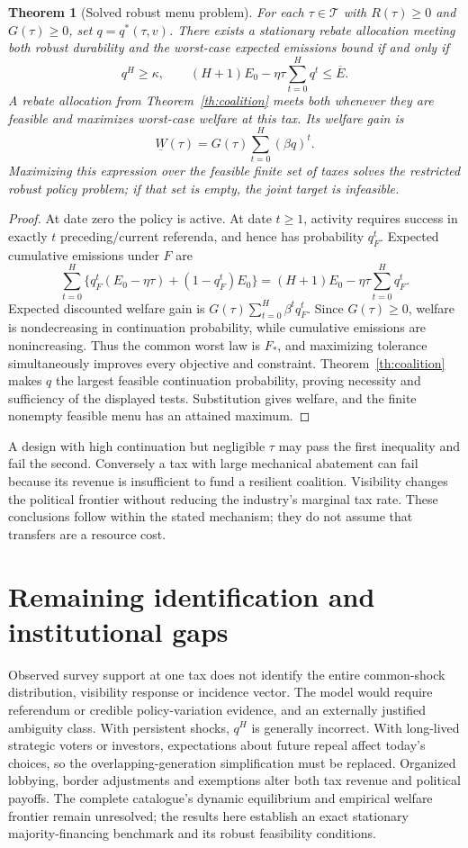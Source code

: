 \documentclass[11pt,a4paper]{article}
\newtheorem{theorem}{Theorem}[section]
\theoremstyle{definition}
\theoremstyle{remark}
\begin{document}
\begin{theorem}[Solved robust menu problem]\label{th:policy}
For each $\tau\in\mathcal T$ with $R(\tau)\geq0$ and $G(\tau)\geq0$, set $q=q^*(\tau,v)$. There exists a stationary rebate allocation meeting both robust durability and the worst-case expected emissions bound if and only if
\[
 q^H\geq\kappa,\qquad
 (H+1)E_0-\eta\tau\sum_{t=0}^Hq^t\leq\overline E.
\]
A rebate allocation from Theorem~\ref{th:coalition} meets both whenever they are feasible and maximizes worst-case welfare at this tax. Its welfare gain is
\[
 \underline W(\tau)=G(\tau)\sum_{t=0}^H(\beta q)^t.
\]
Maximizing this expression over the feasible finite set of taxes solves the restricted robust policy problem; if that set is empty, the joint target is infeasible.
\end{theorem}
\begin{proof}
At date zero the policy is active. At date $t\geq1$, activity requires success in exactly $t$ preceding/current referenda, and hence has probability $q_F^t$. Expected cumulative emissions under $F$ are
\[
 \sum_{t=0}^H\{q_F^t(E_0-\eta\tau)+(1-q_F^t)E_0\}
 =(H+1)E_0-\eta\tau\sum_{t=0}^Hq_F^t.
\]
Expected discounted welfare gain is $G(\tau)\sum_{t=0}^H\beta^tq_F^t$. Since $G(\tau)\geq0$, welfare is nondecreasing in continuation probability, while cumulative emissions are nonincreasing. Thus the common worst law is $F_*$, and maximizing tolerance simultaneously improves every objective and constraint. Theorem~\ref{th:coalition} makes $q$ the largest feasible continuation probability, proving necessity and sufficiency of the displayed tests. Substitution gives welfare, and the finite nonempty feasible menu has an attained maximum.
\end{proof}

A design with high continuation but negligible $\tau$ may pass the first inequality and fail the second. Conversely a tax with large mechanical abatement can fail because its revenue is insufficient to fund a resilient coalition. Visibility changes the political frontier without reducing the industry's marginal tax rate. These conclusions follow within the stated mechanism; they do not assume that transfers are a resource cost.

\section{Remaining identification and institutional gaps}
Observed survey support at one tax does not identify the entire common-shock distribution, visibility response or incidence vector. The model would require referendum or credible policy-variation evidence, and an externally justified ambiguity class. With persistent shocks, $q^H$ is generally incorrect. With long-lived strategic voters or investors, expectations about future repeal affect today's choices, so the overlapping-generation simplification must be replaced. Organized lobbying, border adjustments and exemptions alter both tax revenue and political payoffs. The complete catalogue's dynamic equilibrium and empirical welfare frontier remain unresolved; the results here establish an exact stationary majority-financing benchmark and its robust feasibility conditions.
\end{document}
